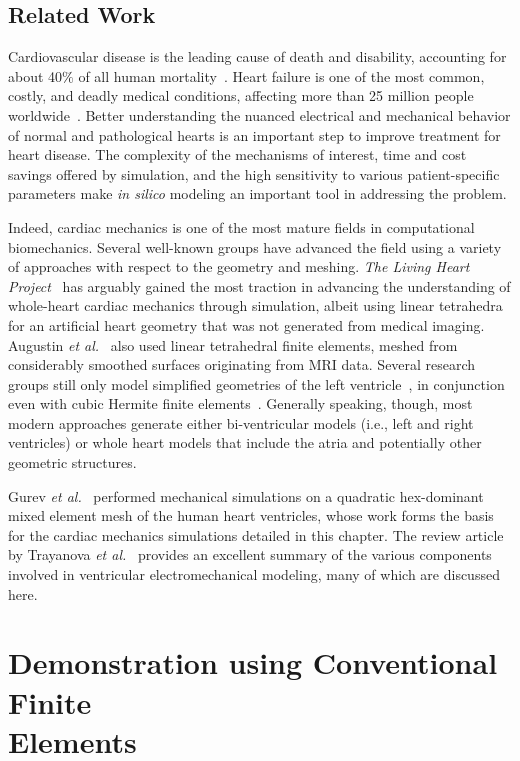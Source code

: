 \subsection{Related Work}
Cardiovascular disease is the leading cause of death and disability, accounting for about 40$\%$ of all human mortality~\cite{genet_2015}. Heart failure is one of the most common, costly, and deadly medical conditions, affecting more than 25 million people worldwide~\cite{mann_2015}. Better understanding the nuanced electrical and mechanical behavior of normal and pathological hearts is an important step to improve treatment for heart disease. The complexity of the mechanisms of interest, time and cost savings offered by simulation, and the high sensitivity to various patient-specific parameters make \textit{in silico} modeling an important tool in addressing the problem.

Indeed, cardiac mechanics is one of the most mature fields in computational biomechanics. Several well-known groups have advanced the field using a variety of approaches with respect to the geometry and meshing. \textit{The Living Heart Project}~\cite{genet_2015, baillargeon_2014} has arguably gained the most traction in advancing the understanding of whole-heart cardiac mechanics through simulation, albeit using linear tetrahedra for an artificial heart geometry that was not generated from medical imaging. Augustin \textit{et al.}~\cite{augustin_2016} also used linear tetrahedral finite elements, meshed from considerably smoothed surfaces originating from MRI data. Several research groups still only model simplified geometries of the left ventricle~\cite{guccione_2005, sack_2016}, in conjunction even with cubic Hermite finite elements~\cite{mcculloch_2000}. Generally speaking, though, most modern approaches generate either bi-ventricular models (i.e., left and right ventricles) or whole heart models that include the atria and potentially other geometric structures.

Gurev \textit{et al.}~\cite{gurev_2015} performed mechanical simulations on a quadratic hex-dominant mixed element mesh of the human heart ventricles, whose work forms the basis for the cardiac mechanics simulations detailed in this chapter. The review article by Trayanova \textit{et al.}~\cite{trayanova_2011} provides an excellent summary of the various components involved in ventricular electromechanical modeling, many of which are discussed here.

\section[Demonstration using Conventional Finite Elements]{Demonstration using Conventional Finite \\ Elements}

